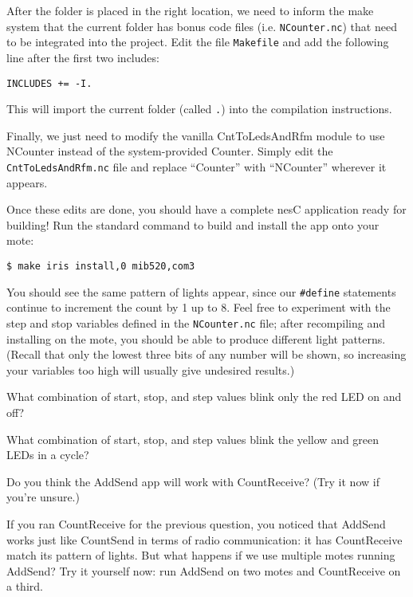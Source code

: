 \documentclass{article}
\begin{document}
After the folder is placed in the right location, we need to inform the make system that the current folder has bonus code files (i.e. \verb!NCounter.nc!) that need to be integrated into the project. Edit the file \verb!Makefile! and add the following line after the first two includes:

\begin{verbatim}
INCLUDES += -I.
\end{verbatim}

This will import the current folder (called \verb!.!) into the compilation instructions.

Finally, we just need to modify the vanilla CntToLedsAndRfm module to use NCounter instead of the system-provided Counter. Simply edit the \verb!CntToLedsAndRfm.nc! file and replace ``Counter'' with ``NCounter'' wherever it appears.

Once these edits are done, you should have a complete nesC application ready for building! Run the standard command to build and install the app onto your mote:

\begin{verbatim}
$ make iris install,0 mib520,com3
\end{verbatim}

You should see the same pattern of lights appear, since our \verb!#define! statements continue to increment the count by 1 up to 8. Feel free to experiment with the step and stop variables defined in the \verb!NCounter.nc! file; after recompiling and installing on the mote, you should be able to produce different light patterns. (Recall that only the lowest three bits of any number will be shown, so increasing your variables too high will usually give undesired results.)

 What combination of start, stop, and step values blink only the red LED on and off?

 What combination of start, stop, and step values blink the yellow and green LEDs in a cycle?

 Do you think the AddSend app will work with CountReceive? (Try it now if you're unsure.)


If you ran CountReceive for the previous question, you noticed that AddSend works just like CountSend in terms of radio communication: it has CountReceive match its pattern of lights. But what happens if we use multiple motes running AddSend? Try it yourself now: run AddSend on two motes and CountReceive on a third.
\end{document}
